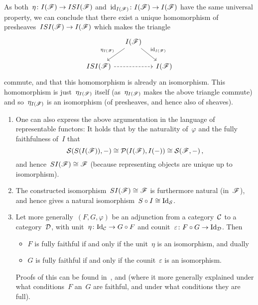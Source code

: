 \begin{example}
\begin{enumerate}
      As both~$\eta \colon I(\mathscr{F}) \to ISI(\mathscr{F})$ and~$\operatorname{id}_{I(\mathscr{F})} \colon I(\mathscr{F}) \to I(\mathscr{F})$ have the same universal property, we can conclude that there exist a unique homomorphism of presheaves~$ISI(\mathscr{F}) \to I(\mathscr{F})$ which makes the triangle
      \[
        \begin{tikzcd}[column sep = small]
            {}
          & I(\Fs)
            \arrow{dl}[above left]{\eta_{I(\Fs)}}
            \arrow{dr}[above right]{\id_{I(\Fs)}}
          & {}
          \\
            ISI(\Fs)
            \arrow[dashed]{rr}
          & {}
          & I(\Fs)
        \end{tikzcd}
      \]
      commute, and that this homomorphism is already an isomorphism.
      This homomorphism is just~$\eta_{I(\mathscr{F})}$ itself (as~$\eta_{I(\mathscr{F})}$ makes the above triangle commute) and so~$\eta_{I(\mathscr{F})}$ is an isomorphism (of presheaves, and hence also of sheaves).
      \begin{remark*}
        \leavevmode
        \begin{enumerate}
          \item
            One can also express the above argumentation in the language of representable functors:
            It holds that by the naturality of~$\varphi$ and the fully faithfulness of~$I$ that
            \[
                    \mathcal{S}(S(I(\mathscr{F})), -)
              \cong \mathcal{P}(I(\mathscr{F}), I(-))
              \cong \mathcal{S}(\mathscr{F}, -) \,,
            \]
            and hence~$SI(\mathscr{F}) \cong \mathscr{F}$ (because representing objects are unique up to isomorphism).
          \item
            The constructed isomorphism~$SI(\mathscr{F}) \cong \mathscr{F}$ is furthermore natural (in~$\mathscr{F}$), and hence gives a natural isomorphism~$S \circ I \cong \mathrm{Id}_{\mathcal{S}}$.
          \item
            Let more generally~$(F,G,\varphi)$ be an adjunction from a category~$\mathcal{C}$ to a category~$\mathcal{D}$, with unit~$\eta \colon \mathrm{Id}_{\mathcal{C}} \to G \circ F$ and counit~$\varepsilon \colon F \circ G \to \mathrm{Id}_{\mathcal{D}}$.
            Then
            \begin{itemize}
              \item
                $F$ is fully faithful if and only if the unit~$\eta$ is an isomorphism, and dually
              \item
                $G$ is fully faithful if and only if the counit~$\varepsilon$ is an isomorphism.
            \end{itemize}
            Proofs of this can be found in~\cite{stackfullyfaithful}, \cite[Lemma 7.6.6]{Brandenburg} and \cite[IV,~3,~Theorem~1]{Working} (where it more generally explained under what conditions~$F$ an~$G$ are faithful, and under what conditions they are full).
        \end{enumerate}
      \end{remark*}
      

\end{enumerate}
\end{example}
